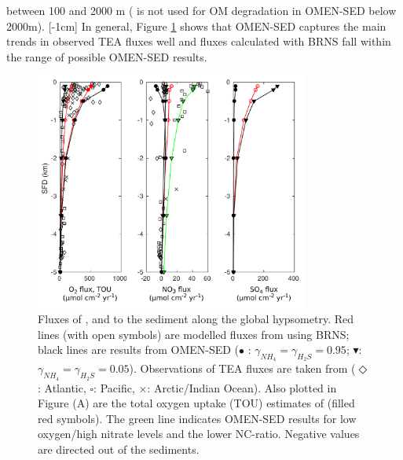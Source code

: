 \documentclass[gmd, manuscript]{copernicus}
\begin{document}
between 100 and 2000 m ( is not used for OM degradation in OMEN-SED below 2000m).
[-1cm]%
In general, Figure \ref{fig:hypsometry} shows that OMEN-SED captures the main trends in observed TEA fluxes well and fluxes calculated with BRNS fall within the range of possible OMEN-SED results. 
\begin{figure}[htbp]
\begin{center}
	\includegraphics[width=0.8\textwidth]{figures/0_OMEN_Thullner_hypsometry_fluxes_diff_NCratio.pdf}
	\caption{Fluxes of ,  and  to the sediment along the global hypsometry. 
	Red lines (with open symbols) are modelled fluxes from \citet{thullner_global_scale_2009} using BRNS; black lines are results from OMEN-SED ($\bullet$ : $\gamma_{NH_4}=\gamma_{H_2S}=0.95$; 
	$\blacktriangledown$: $\gamma_{NH_4}=\gamma_{H_2S}=0.05$). 
	Observations of TEA fluxes are taken from \citet{middelburg_denitrification_1996} ($\Diamond$: Atlantic, $\square$: Pacific, $\times$: Arctic/Indian Ocean). 
	Also plotted in Figure (A) are the total oxygen uptake (TOU) estimates of \citet{thullner_global_scale_2009} (filled red symbols). The green line indicates OMEN-SED results for low oxygen/high nitrate levels and the lower 
	NC-ratio. Negative values are directed out of the sediments.
	}\label{fig:hypsometry}
\end{center}
\end{figure}
\end{document}
